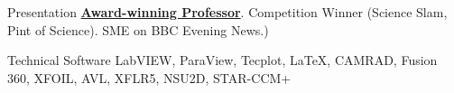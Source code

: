 \begin{cvskills}
\cvskill
{Presentation}
{\textcolor{cyan}{\textbf{\href{https://www.iit.edu/news/engineering-faculty-member-awarded-provosts-inaugural-online-teaching-award?fbclid=IwAR1rnJJH0X0j_ZoT1OAlPZm4HNpREQp_A0Hx-8LIhM_4BP7b8K9ChcNPFFI}{Award-winning Professor}}}. Competition Winner (Science Slam, Pint of Science). SME on BBC Evening News.)}

%


%





\cvskill
{Technical Software} %
{LabVIEW, ParaView, Tecplot, \LaTeX, CAMRAD, Fusion 360, XFOIL, AVL, XFLR5, NSU2D, STAR-CCM+} %






%
%
\end{cvskills}